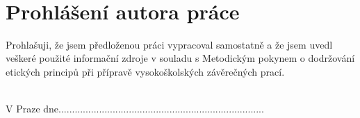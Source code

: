 ~\vfill{}

\section*{Prohlášení autora práce}
Prohlašuji, že jsem předloženou práci vypracoval samostatně a že jsem uvedl veškeré použité informační zdroje v souladu s Metodickým pokynem o dodržování etických principů při přípravě vysokoškolských závěrečných prací.

\vspace{1.5cm}
~\\

V Praze dne.............................\hfill{}...............................................

\hfill{}~~~~~~~~~~~~~~~

\newpage{}
